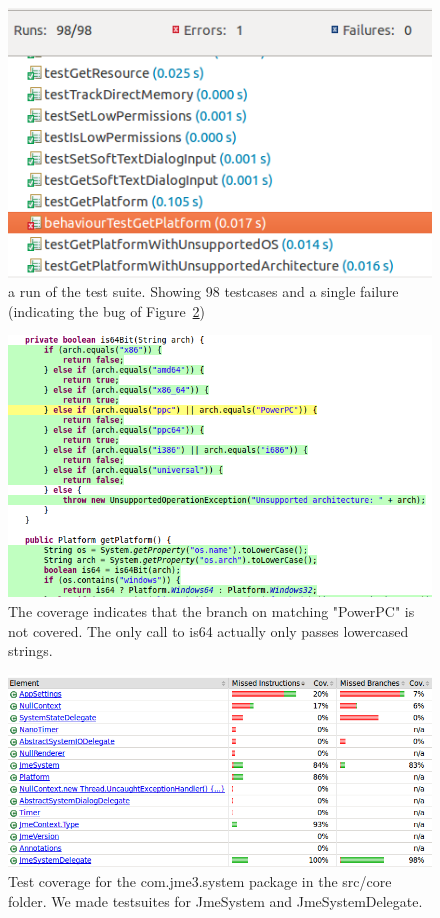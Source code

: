 \documentclass[a4paper, 10pt]{article}
\begin{document}
\begin{figure}[!hb]
\includegraphics[width=\textwidth]{figures/86-new-tests.png}
\caption{a run of the test suite. Showing 98 testcases and a single failure (indicating the bug of Figure~\ref{fig:bug})}
\label{fig:num-tests}
\end{figure}

\begin{figure}[!hb]
\includegraphics[width=\textwidth]{figures/bug-in-delegate.png}
\caption{The coverage indicates that the branch on matching "PowerPC" is not covered. The only call to is64 actually only passes lowercased strings.}
\label{fig:bug}
\end{figure}

\begin{figure}[!hb]
\includegraphics[width=\textwidth]{figures/test-coverage-core.png}
\caption{Test coverage for the com.jme3.system package in the src/core folder. We made testsuites for JmeSystem and JmeSystemDelegate.}
\label{fig:cov-core}
\end{figure}
\end{document}
